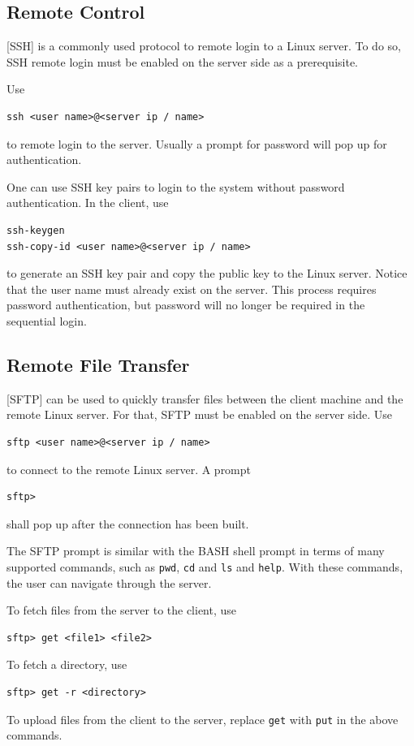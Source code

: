 \subsection{Remote Control}

[SSH] is a commonly used protocol to remote login to a Linux server. To do so, SSH remote login must be enabled on the server side as a prerequisite. 

Use
\begin{lstlisting}
ssh <user name>@<server ip / name>
\end{lstlisting} 
to remote login to the server. Usually a prompt for password will pop up for authentication.

One can use SSH key pairs to login to the system without password authentication. In the client, use
\begin{lstlisting}
ssh-keygen
ssh-copy-id <user name>@<server ip / name>
\end{lstlisting}
to generate an SSH key pair and copy the public key to the Linux server. Notice that the user name must already exist on the server. This process requires password authentication, but password will no longer be required in the sequential login.

\subsection{Remote File Transfer}

[SFTP] can be used to quickly transfer files between the client machine and the remote Linux server. For that, SFTP must be enabled on the server side. Use
\begin{lstlisting}
sftp <user name>@<server ip / name>
\end{lstlisting}
to connect to the remote Linux server. A prompt
\begin{lstlisting}
sftp>
\end{lstlisting}
shall pop up after the connection has been built.

The SFTP prompt is similar with the BASH shell prompt in terms of many supported commands, such as \verb|pwd|, \verb|cd| and \verb|ls| and \verb|help|. With these commands, the user can navigate through the server.

To fetch files from the server to the client, use
\begin{lstlisting}
sftp> get <file1> <file2>
\end{lstlisting}
To fetch a directory, use
\begin{lstlisting}
sftp> get -r <directory>
\end{lstlisting}
To upload files from the client to the server, replace \verb|get| with \verb|put| in the above commands.

